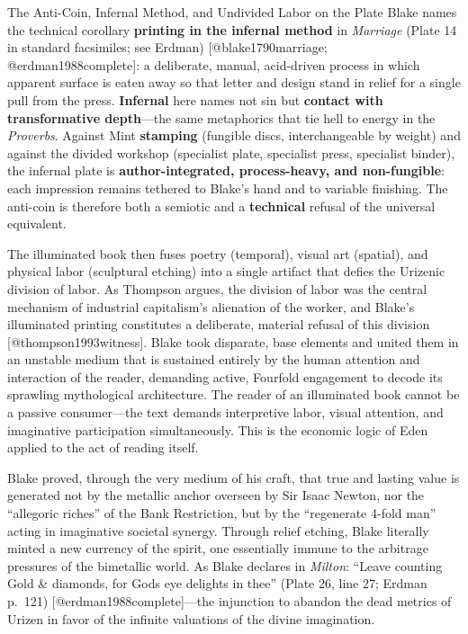 \documentclass[
  ignorenonframetext,
]{beamer}
\begin{document}
\begin{frame}{The Anti-Coin, Infernal Method, and Undivided Labor on the
Plate}
Blake names the technical corollary \textbf{printing in the infernal
method} in \emph{Marriage} (Plate 14 in standard facsimiles; see Erdman)
{[}@blake1790marriage; @erdman1988complete{]}: a deliberate, manual,
acid-driven process in which apparent surface is eaten away so that
letter and design stand in relief for a single pull from the press.
\textbf{Infernal} here names not sin but \textbf{contact with
transformative depth}---the same metaphorics that tie hell to energy in
the \emph{Proverbs}. Against Mint \textbf{stamping} (fungible discs,
interchangeable by weight) and against the divided workshop (specialist
plate, specialist press, specialist binder), the infernal plate is
\textbf{author-integrated, process-heavy, and non-fungible}: each
impression remains tethered to Blake's hand and to variable finishing.
The anti-coin is therefore both a semiotic and a \textbf{technical}
refusal of the universal equivalent.

The illuminated book then fuses poetry (temporal), visual art (spatial),
and physical labor (sculptural etching) into a single artifact that
defies the Urizenic division of labor. As Thompson argues, the division
of labor was the central mechanism of industrial capitalism's alienation
of the worker, and Blake's illuminated printing constitutes a
deliberate, material refusal of this division
{[}@thompson1993witness{]}. Blake took disparate, base elements and
united them in an unstable medium that is sustained entirely by the
human attention and interaction of the reader, demanding active,
Fourfold engagement to decode its sprawling mythological architecture.
The reader of an illuminated book cannot be a passive consumer---the
text demands interpretive labor, visual attention, and imaginative
participation simultaneously. This is the economic logic of Eden applied
to the act of reading itself.

Blake proved, through the very medium of his craft, that true and
lasting value is generated not by the metallic anchor overseen by Sir
Isaac Newton, nor the ``allegoric riches'' of the Bank Restriction, but
by the ``regenerate 4-fold man'' acting in imaginative societal synergy.
Through relief etching, Blake literally minted a new currency of the
spirit, one essentially immune to the arbitrage pressures of the
bimetallic world. As Blake declares in \emph{Milton}: ``Leave counting
Gold \& diamonds, for Gods eye delights in thee'' (Plate 26, line 27;
Erdman p.~121) {[}@erdman1988complete{]}---the injunction to abandon the
dead metrics of Urizen in favor of the infinite valuations of the divine
imagination.
\end{frame}
\end{document}
